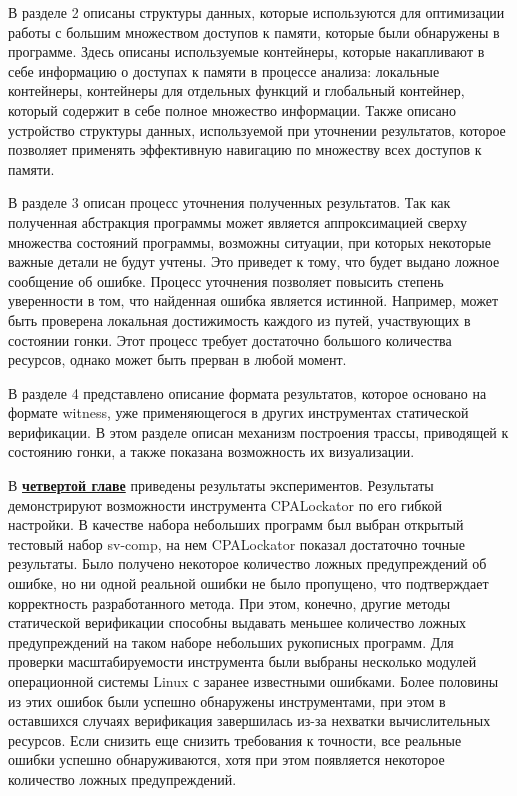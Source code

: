 В разделе 2 описаны структуры данных, которые используются для оптимизации работы с большим множеством доступов к памяти, которые были обнаружены в программе.
Здесь описаны используемые контейнеры, которые накапливают в себе информацию о доступах к памяти в процессе анализа: локальные контейнеры, контейнеры для отдельных функций и глобальный контейнер, который содержит в себе полное множество информации.
Также описано устройство структуры данных, используемой при уточнении результатов, которое позволяет применять эффективную навигацию по множеству всех доступов к памяти.

В разделе 3 описан процесс уточнения полученных результатов.
Так как полученная абстракция программы может является аппроксимацией сверху множества состояний программы, возможны ситуации, при которых некоторые важные детали не будут учтены. 
Это приведет к тому, что будет выдано ложное сообщение об ошибке. 
Процесс уточнения позволяет повысить степень уверенности в том, что найденная ошибка является истинной.
Например, может быть проверена локальная достижимость каждого из путей, участвующих в состоянии гонки.
Этот процесс требует достаточно большого количества ресурсов, однако может быть прерван в любой момент.

В разделе 4 представлено описание формата результатов, которое основано на формате witness, уже применяющегося в других инструментах статической верификации.
В этом разделе описан механизм построения трассы, приводящей к состоянию гонки, а также показана возможность их визуализации.


В \underline{\textbf{четвертой главе}} приведены результаты экспериментов.
Результаты демонстрируют возможности инструмента CPALockator по его гибкой настройки.
В качестве набора небольших программ был выбран открытый тестовый набор sv-comp, на нем CPALockator показал достаточно точные результаты. 
Было получено некоторое количество ложных предупреждений об ошибке, но ни одной реальной ошибки не было пропущено, что подтверждает корректность разработанного метода.
При этом, конечно, другие методы статической верификации способны выдавать меньшее количество ложных предупреждений на таком наборе небольших рукописных программ.
Для проверки масштабируемости инструмента были выбраны несколько модулей операционной системы Linux с заранее известными ошибками.
Более половины из этих ошибок были успешно обнаружены инструментами, при этом в оставшихся случаях верификация завершилась из-за нехватки вычислительных ресурсов.
Если снизить еще снизить требования к точности, все реальные ошибки успешно обнаруживаются, хотя при этом появляется некоторое количество ложных предупреждений.

